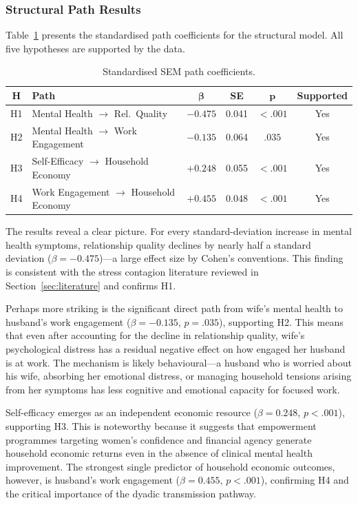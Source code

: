 \documentclass[12pt, a4paper]{article}
\begin{document}
\subsubsection{Structural Path Results}

Table~\ref{tab:paths} presents the standardised path coefficients for the structural model. All five hypotheses are supported by the data.

\begin{table}[H]
\centering
\caption{Standardised SEM path coefficients.}
\label{tab:paths}
\small
\begin{tabular}{clcccc}
\toprule
\textbf{H} & \textbf{Path} & $\boldsymbol{\beta}$ & \textbf{SE} & $\boldsymbol{p}$ & \textbf{Supported} \\
\midrule
H1 & Mental Health $\rightarrow$ Rel.\ Quality     & $-0.475$ & 0.041 & $<.001$ & Yes \\
H2 & Mental Health $\rightarrow$ Work Engagement    & $-0.135$ & 0.064 & $.035$  & Yes \\
H3 & Self-Efficacy $\rightarrow$ Household Economy  & $+0.248$ & 0.055 & $<.001$ & Yes \\
H4 & Work Engagement $\rightarrow$ Household Economy & $+0.455$ & 0.048 & $<.001$ & Yes \\
\bottomrule
\end{tabular}
\end{table}

The results reveal a clear picture. For every standard-deviation increase in mental health symptoms, relationship quality declines by nearly half a standard deviation ($\beta = -0.475$)—a large effect size by Cohen's \citeyearpar{cohen1988} conventions. This finding is consistent with the stress contagion literature reviewed in Section~\ref{sec:literature} and confirms H1.

Perhaps more striking is the significant direct path from wife's mental health to husband's work engagement ($\beta = -0.135$, $p = .035$), supporting H2. This means that even after accounting for the decline in relationship quality, wife's psychological distress has a residual negative effect on how engaged her husband is at work. The mechanism is likely behavioural—a husband who is worried about his wife, absorbing her emotional distress, or managing household tensions arising from her symptoms has less cognitive and emotional capacity for focused work.

Self-efficacy emerges as an independent economic resource ($\beta = 0.248$, $p < .001$), supporting H3. This is noteworthy because it suggests that empowerment programmes targeting women's confidence and financial agency generate household economic returns even in the absence of clinical mental health improvement. The strongest single predictor of household economic outcomes, however, is husband's work engagement ($\beta = 0.455$, $p < .001$), confirming H4 and the critical importance of the dyadic transmission pathway.
\end{document}
